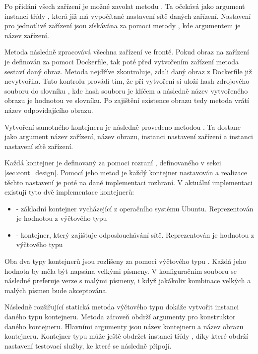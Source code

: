 Po přidání všech zařízení je možné zavolat metodu . Ta očekává jako argument instanci třídy , která již má vypočítané nastavení sítě daných zařízení. Nastavení pro jednotlivé zařízení jsou získávána za pomoci metody , kde argumentem je název zařízení. 

Metoda  následně zpracovává všechna zařízení ve frontě. Pokud obraz na zařízení je definován za pomoci Dockerfile, tak poté před vytvořením zařízení metoda  sestaví daný obraz. Metoda nejdříve zkontroluje, zdali daný obraz z Dockerfile již nevytvořila. Tuto kontrolu provádí tím, že při vytvoření si uloží hash zdrojového souboru do slovníku , kde hash souboru je klíčem a následně název vytvořeného obrazu je hodnotou ve slovníku. Po zajištění existence obrazu tedy metoda  vrátí název odpovídajícího obrazu. 

Vytvoření samotného kontejneru je následně provedeno metodou . Ta dostane jako argument název zařízení, název obrazu, instanci nastavení zařízení a instanci nastavení sítě zařízení. 

Každá kontejner je definovaný za pomoci rozraní , definovaného v sekci \ref{sec:cont_design}. Pomocí jeho metod je každý kontejner nastavován a realizace těchto nastavení je poté na dané implementaci rozhraní. V aktuální implementaci existují tyto dvě implementace kontejnerů: 

\begin{itemize}
    \item {} - základní kontejner vycházející z operačního systému Ubuntu. Reprezentován je hodnotou z výčtového typu  
    \item {} - kontejner, který zajišťuje odposlouchávání sítě. Reprezentován je hodnotou z výčtového typu 
\end{itemize}

Oba dva typy kontejnerů jsou rozlišeny za pomoci výčtového typu . Každá jeho hodnota by měla být napsána velkými písmeny. V konfiguračním souboru se následně preferuje verze s malými písmeny, i když jakákoliv kombinace velkých a malých písmen bude akceptována. 

Následně rozšiřující statická metoda výčtového typu  dokáže vytvořit instanci daného typu kontejneru. Metoda zároveň obdrží argumenty pro konstruktor daného kontejneru. Hlavními argumenty jsou název kontejneru a název obrazu kontejneru. Kontejner typu  může ještě obdržet instanci třídy , díky které obdrží nastavení testovací služby, ke které se následně připojí. 

